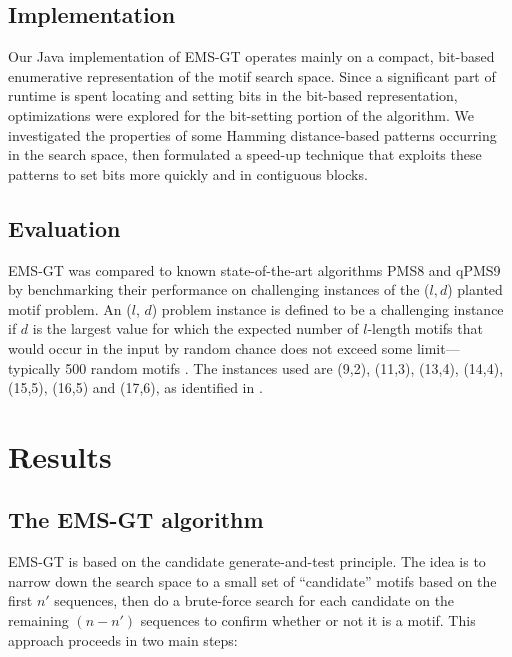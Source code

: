 \documentclass[conference]{IEEEtran}
\begin{document}
	\subsection{Implementation}
		Our Java implementation of EMS-GT operates mainly on a compact, bit-based enumerative representation of the motif search space. Since a significant part of runtime is spent locating and setting bits in the bit-based representation, optimizations were explored for the bit-setting portion of the algorithm. We investigated the properties of some Hamming distance-based patterns occurring in the search space, then formulated a speed-up technique that exploits these patterns to set bits more quickly and in contiguous blocks.

	\subsection{Evaluation}
		EMS-GT was compared to known state-of-the-art algorithms PMS8 and qPMS9 by benchmarking their performance on challenging instances of the ($l, d$) planted motif problem. An ($l$, $d$) problem instance is defined to be a challenging instance if $d$ is the largest value for which the expected number of $l$-length motifs that would occur in the input by random chance does not exceed some limit---typically 500 random motifs \cite{pms2015}. The instances used are (9,2), (11,3), (13,4), (14,4), (15,5), (16,5) and (17,6), as identified in \cite{pms2015,pms2007}. 

\section{Results}
	\subsection{The EMS-GT algorithm}
		EMS-GT is based on the candidate generate-and-test principle. The idea is to narrow down the search space to a small set of ``candidate'' motifs based on the first $n'$ sequences, then do a brute-force search for each candidate on the remaining $(n - n')$ sequences to confirm whether or not it is a motif. This approach proceeds in two main steps:\newline
\end{document}
